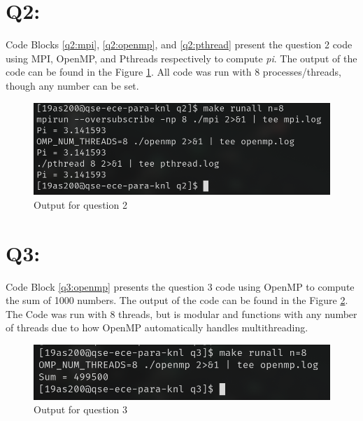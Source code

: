 \documentclass[11pt]{article}
\begin{document}
\newpage

\section*{Q2:}

Code Blocks \ref{q2:mpi}, \ref{q2:openmp}, and \ref{q2:pthread} present the question 2 code using MPI, OpenMP, and Pthreads respectively to compute \textit{pi}.
The output of the code can be found in the Figure \ref{fig:q2}.
All code was run with 8 processes/threads, though any number can be set. 






\begin{figure}[H]
\centering
    \includegraphics[width=\textwidth]{./images/q2.png}
\caption{Output for question 2}
\label{fig:q2}
\end{figure}

\newpage
\section*{Q3:}
Code Block \ref{q3:openmp} presents the question 3 code using OpenMP to compute the sum of 1000 numbers.
The output of the code can be found in the Figure \ref{fig:q3}.
The Code was run with 8 threads, but is modular and functions with any number of threads due to how OpenMP automatically handles multithreading.



\begin{figure}[H]
\centering
    \includegraphics[width=\textwidth]{./images/q3.png}
\caption{Output for question 3}
\label{fig:q3}
\end{figure}
\end{document}
